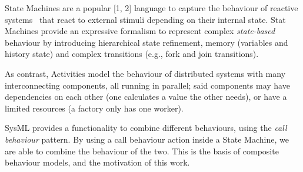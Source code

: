 State Machines are a popular [1, 2] language to capture the behaviour
of reactive systems~\cite{HAREL1987231} that react to external stimuli depending on
their internal state. Stat Machines provide an expressive formalism to
represent complex \emph{state-based} behaviour by introducing hierarchical
state refinement, memory (variables and history state) and complex
transitions (e.g., fork and join transitions).

As contrast, Activities model the behaviour of distributed systems with many interconnecting components, all running in parallel; said components may have dependencies on each other (one calculates a value the other needs), or have a limited resources (a factory only has one worker).

SysML provides a functionality to combine different behaviours, using the \emph{call behaviour} pattern. By using a call behaviour action inside a State Machine, we are able to combine the behaviour of the two. This is the basis of composite behaviour models, and the motivation of this work. 
\fi
